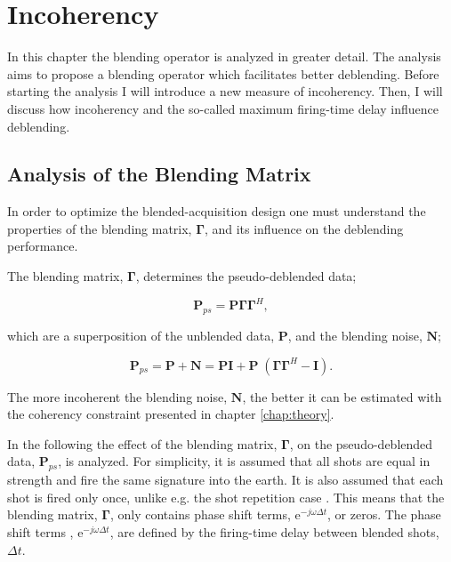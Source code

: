 \chapter{Incoherency} \label{chap:Incoherency}

In this chapter the blending operator is analyzed in greater detail. The analysis aims to propose a blending operator which facilitates better deblending. Before starting the analysis I will introduce a new measure of incoherency. Then, I will discuss how incoherency and the so-called maximum firing-time delay influence deblending.

\section{Analysis of the Blending Matrix} \label{sec:BlendingMatrix}

In order to optimize the blended-acquisition design one must understand the properties of the blending matrix, $\mathbf{\Gamma}$, and its influence on the deblending performance.

The blending matrix, $\mathbf{\Gamma}$, determines the pseudo-deblended data;

\begin{equation}
	\mathbf{P}_{ps} = \mathbf{P \Gamma \Gamma}^H,
	\label{eq:Ch-Theory-Pseudo-Deblended-Data}
\end{equation}

which are a superposition of the unblended data, $\mathbf{P}$, and the blending noise, $\mathbf{N}$;

\begin{equation}
	\mathbf{P}_{ps} = \mathbf{P} + \mathbf{N} = \mathbf{P I} + \mathbf{P} \; (\mathbf{\Gamma \Gamma}^H - \mathbf{I}).
	\label{eq:Ch-Theory-PseudoSuperposition}
\end{equation}

The more incoherent the blending noise, $\mathbf{N}$, the better it can be estimated with the coherency constraint presented in chapter \ref{chap:theory}.

In the following the effect of the blending matrix, $\mathbf{\Gamma}$, on the pseudo-deblended data, $\mathbf{P}_{ps}$, is analyzed. For simplicity, it is assumed that all shots are equal in strength and fire the same signature into the earth. It is also assumed that each shot is fired only once, unlike e.g. the shot repetition case \citep{Sixue}. This means that the blending matrix, $\mathbf{\Gamma}$, only contains phase shift terms, $\mathrm{e}^{-j \omega \Delta t}$, or zeros. The phase shift terms , $\mathrm{e}^{-j \omega \Delta t}$, are defined by the firing-time delay between blended shots, $\Delta t$. 

